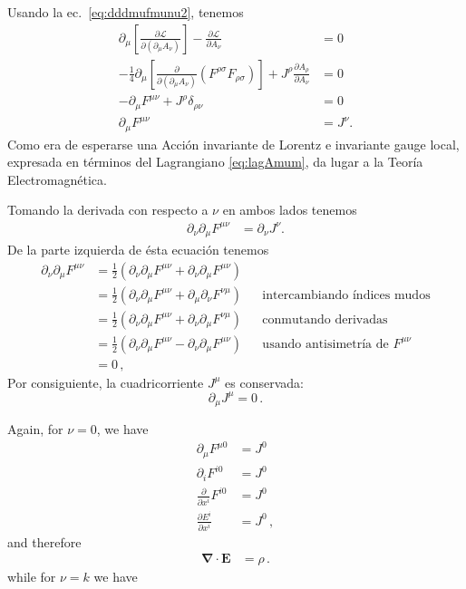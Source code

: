 Usando la ec.~\eqref{eq:dddmufmunu2}, tenemos
\begin{align}
\label{eq:177qft}
  \partial_\mu\left[
    \frac{\partial\mathcal{L}}{\partial(\partial_\mu A_\nu)}  
  \right]-\frac{\partial\mathcal{L}}{\partial A_\nu}&=0\nonumber\\
  -\frac{1}{4}\partial_\mu\left[
    \frac{\partial}{\partial(\partial_\mu A_\nu)}(F^{\rho\sigma}F_{\rho\sigma})  
  \right]+J^\rho\frac{\partial A_\rho}{\partial A_\nu}&=0\nonumber\\
  -\partial_\mu F^{\mu\nu}+J^\rho\delta_{\rho\nu}&=0\nonumber\\
  \partial_\mu F^{\mu\nu}&=J^\nu.
\end{align}
Como era de esperarse una Acción invariante de Lorentz e invariante
gauge local, expresada en términos del Lagrangiano \eqref{eq:lagAmum},
da lugar a la Teoría Electromagnética. 
 
Tomando la derivada con respecto a $\nu$ en ambos lados tenemos
\begin{align}
   \partial_\nu\partial_\mu F^{\mu\nu}&=\partial_\nu J^\nu.
\end{align}
De la parte izquierda de ésta ecuación tenemos
\begin{align*}
  \partial_\nu\partial_\mu F^{\mu\nu}&=\tfrac{1}{2}\left(\partial_\nu\partial_\mu F^{\mu\nu}+\partial_\nu\partial_\mu F^{\mu\nu}  \right)\nonumber\\
&=\tfrac{1}{2}\left(\partial_\nu\partial_\mu F^{\mu\nu}+\partial_\mu\partial_\nu F^{\nu\mu}  \right)
&&\text{intercambiando índices mudos}\nonumber\\
&=\tfrac{1}{2}\left(\partial_\nu\partial_\mu F^{\mu\nu}+\partial_\nu\partial_\mu F^{\nu\mu}  \right)
&&\text{conmutando derivadas}\nonumber\\
&=\tfrac{1}{2}\left(\partial_\nu\partial_\mu F^{\mu\nu}-\partial_\nu\partial_\mu F^{\mu\nu}  \right)
&&\text{usando antisimetría de $F^{\mu\nu}$}\nonumber\\
&=0\,,
\end{align*}
Por consiguiente, la cuadricorriente $J^\mu$ es conservada:
\begin{equation}
  \label{eq:consvjmu}
  \partial_\mu J^\mu=0\,.
\end{equation}


Again, for $\nu=0$, we have
\begin{align}
  \label{nohomME21}
    \partial_\mu F^{\mu0}&=J^0\nonumber\\
    \partial_iF^{i0}&=J^0\nonumber\\
    \frac{\partial}{\partial x^{i}}F^{i0}&=J^0\nonumber\\
    \frac{\partial E^{i}}{\partial x^{i}}&=J^0\,,
\end{align}
and therefore
\begin{align}
   \boldsymbol{\nabla}\cdot\mathbf{E}&=\rho\,.
\end{align}
while for $\nu=k$ we have

